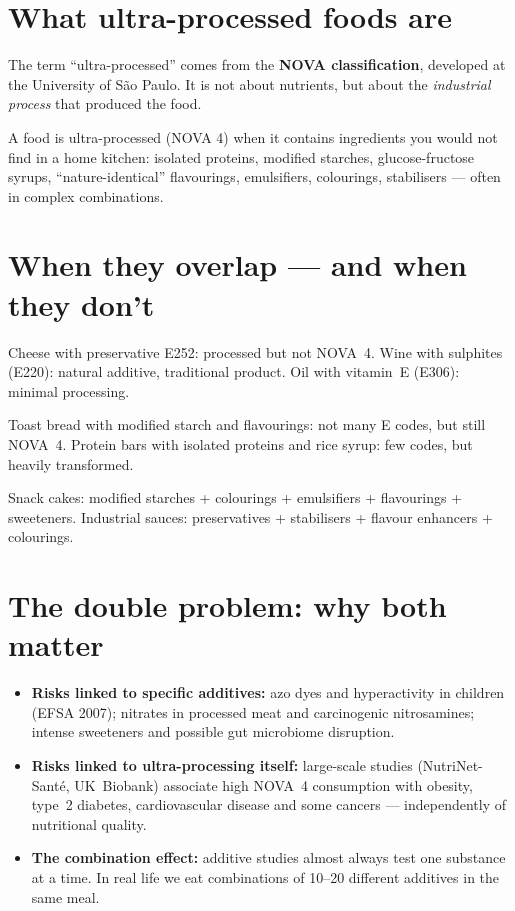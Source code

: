 \documentclass[a5paper,12pt,oneside,openany]{book}
\newcommand{\boxgreen}[2]{%
  \begin{tcolorbox}[boxbase,
    colback=verdescuro!8!white, colframe=verdescuro, title={#1}]
  #2\end{tcolorbox}}
\newcommand{\boxyellow}[2]{%
  \begin{tcolorbox}[boxbase,
    colback=warnyellow!12!white, colframe=warnyellow!80!black, title={#1}]
  #2\end{tcolorbox}}
\newcommand{\boxred}[2]{%
  \begin{tcolorbox}[boxbase,
    colback=warnred!8!white, colframe=warnred, title={#1}]
  #2\end{tcolorbox}}
\begin{document}
\section{What ultra-processed foods are}

The term ``ultra-processed'' comes from the \textbf{NOVA classification},
developed at the University of S\~{a}o Paulo. It is not about nutrients,
but about the \emph{industrial process} that produced the food.

A food is ultra-processed (NOVA 4) when it contains ingredients you
would not find in a home kitchen: isolated proteins, modified starches,
glucose-fructose syrups, ``nature-identical'' flavourings, emulsifiers,
colourings, stabilisers --- often in complex combinations.

\section{When they overlap --- and when they don't}

\boxgreen{Additives but NOT ultra-processed}{Cheese with preservative
E252: processed but not NOVA~4. Wine with sulphites (E220): natural
additive, traditional product. Oil with vitamin~E (E306): minimal
processing.}

\boxred{Ultra-processed with FEW E additives}{Toast bread with modified
starch and flavourings: not many E codes, but still NOVA~4. Protein bars
with isolated proteins and rice syrup: few codes, but heavily
transformed.}

\boxyellow{Ultra-processed AND many additives (the worst case)}{Snack
cakes: modified starches + colourings + emulsifiers + flavourings +
sweeteners. Industrial sauces: preservatives + stabilisers + flavour
enhancers + colourings.}

\section{The double problem: why both matter}

\begin{itemize}
  \item \textbf{Risks linked to specific additives:} azo dyes and
    hyperactivity in children (EFSA 2007); nitrates in processed meat
    and carcinogenic nitrosamines; intense sweeteners and possible gut
    microbiome disruption.
  \item \textbf{Risks linked to ultra-processing itself:} large-scale
    studies (NutriNet-Santé, UK~Biobank) associate high NOVA~4 consumption
    with obesity, type~2 diabetes, cardiovascular disease and some cancers
    --- independently of nutritional quality.
  \item \textbf{The combination effect:} additive studies almost always
    test one substance at a time. In real life we eat combinations of
    10--20 different additives in the same meal.
\end{itemize}
\end{document}
